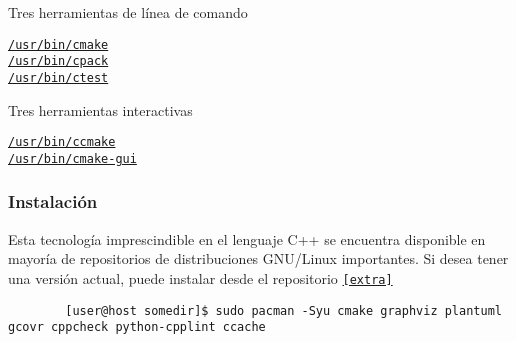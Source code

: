 \begin{frame}[fragile]
	Tres herramientas de línea de comando

	\begin{description}
		\item[\href{https://man.archlinux.org/man/cmake.1}{\lstinline{/usr/bin/cmake}}]

		\item[\href{https://man.archlinux.org/man/cpack.1}{\lstinline{/usr/bin/cpack}}]

		\item[\href{https://man.archlinux.org/man/ctest.1}{\lstinline{/usr/bin/ctest}}]
	\end{description}

	Tres herramientas interactivas

	\begin{description}
		\item[\href{https://man.archlinux.org/man/ccmake.1}{\lstinline{/usr/bin/ccmake}}]

		\item[\href{https://man.archlinux.org/man/cmake-gui.1}{\lstinline{/usr/bin/cmake-gui}}]
	\end{description}
\end{frame}

\begin{frame}[fragile]
	\frametitle{Instalación}
	Esta tecnología imprescindible en el lenguaje C++ se encuentra
	disponible en mayoría de repositorios de distribuciones
	GNU/Linux importantes.
	Si desea tener una versión actual, puede instalar desde el
	repositorio \href{https://archlinux.org/packages/extra/x86_64/cmake}{\lstinline{[extra]}}

	\begin{verbatim}
		[user@host somedir]$ sudo pacman -Syu cmake graphviz plantuml gcovr cppcheck python-cpplint ccache
	\end{verbatim}

\end{frame}




